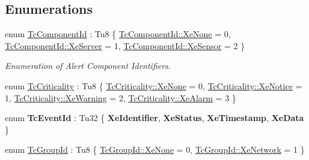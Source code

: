 \subsection*{Enumerations}
\begin{DoxyCompactItemize}
\item 
enum \mbox{\hyperlink{namespace_g_n_common_1_1_g_n_notification_a24173724db4e769e5cf4bc03c70c34cd}{Tc\+Component\+Id}} \+: Tu8 \{ \mbox{\hyperlink{namespace_g_n_common_1_1_g_n_notification_a24173724db4e769e5cf4bc03c70c34cdab1dd4ba140ef44b2b6e425a90b4d11ba}{Tc\+Component\+Id\+::\+Xe\+None}} = 0, 
\mbox{\hyperlink{namespace_g_n_common_1_1_g_n_notification_a24173724db4e769e5cf4bc03c70c34cdab55b8d4cd5d9df32ff6504e150b4a53d}{Tc\+Component\+Id\+::\+Xe\+Server}} = 1, 
\mbox{\hyperlink{namespace_g_n_common_1_1_g_n_notification_a24173724db4e769e5cf4bc03c70c34cdabf624c277a4697a96af203c9507ea0e6}{Tc\+Component\+Id\+::\+Xe\+Sensor}} = 2
 \}
\begin{DoxyCompactList}\small\item\em Enumeration of Alert Component Identifiers. \end{DoxyCompactList}\item 
enum \mbox{\hyperlink{namespace_g_n_common_1_1_g_n_notification_ac544f67a385924ba649033c93a8793eb}{Tc\+Criticality}} \+: Tu8 \{ \mbox{\hyperlink{namespace_g_n_common_1_1_g_n_notification_ac544f67a385924ba649033c93a8793ebab1dd4ba140ef44b2b6e425a90b4d11ba}{Tc\+Criticality\+::\+Xe\+None}} = 0, 
\mbox{\hyperlink{namespace_g_n_common_1_1_g_n_notification_ac544f67a385924ba649033c93a8793eba39f782b17c3f84e4d5a1520a6192a4bc}{Tc\+Criticality\+::\+Xe\+Notice}} = 1, 
\mbox{\hyperlink{namespace_g_n_common_1_1_g_n_notification_ac544f67a385924ba649033c93a8793eba65e6096570843ed0b2a2aadab454461c}{Tc\+Criticality\+::\+Xe\+Warning}} = 2, 
\mbox{\hyperlink{namespace_g_n_common_1_1_g_n_notification_ac544f67a385924ba649033c93a8793eba0e85256e385dd26a18c910f1f4d1c993}{Tc\+Criticality\+::\+Xe\+Alarm}} = 3
 \}
\item 
\mbox{\label{namespace_g_n_common_1_1_g_n_notification_abf47b47263c69457f4a262ee7bf26e30}} 
enum {\bfseries Tc\+Event\+Id} \+: Tu32 \{ {\bfseries Xe\+Identifier}, 
{\bfseries Xe\+Status}, 
{\bfseries Xe\+Timestamp}, 
{\bfseries Xe\+Data}
 \}
\item 
enum \mbox{\hyperlink{namespace_g_n_common_1_1_g_n_notification_af1f68a1b00e03ffcf38b56701fb86167}{Tc\+Group\+Id}} \+: Tu8 \{ \mbox{\hyperlink{namespace_g_n_common_1_1_g_n_notification_af1f68a1b00e03ffcf38b56701fb86167ab1dd4ba140ef44b2b6e425a90b4d11ba}{Tc\+Group\+Id\+::\+Xe\+None}} = 0, 
\mbox{\hyperlink{namespace_g_n_common_1_1_g_n_notification_af1f68a1b00e03ffcf38b56701fb86167af127afdc99e6a03185eab77f17740359}{Tc\+Group\+Id\+::\+Xe\+Network}} = 1
 \}
\end{DoxyCompactItemize}


